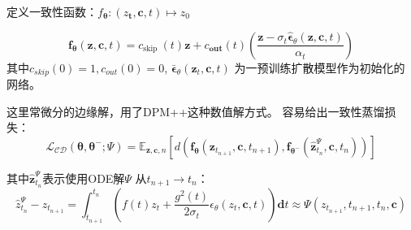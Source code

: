 定义一致性函数：$f_{\boldsymbol{\theta}}:\left(z_{\boldsymbol{t}}, \boldsymbol{c}, t\right) \mapsto z_0$

\begin{equation}
\boldsymbol{f}_{\boldsymbol{\theta}}(\boldsymbol{z}, \boldsymbol{c}, t)=c_{\text {skip }}(t) \boldsymbol{z}+c_{\mathbf{out}}(t)\left(\frac{\boldsymbol{z}-\sigma_t \hat{\boldsymbol{\epsilon}}_\theta(\boldsymbol{z}, \boldsymbol{c}, t)}{\alpha_t}\right)
\end{equation}
其中$c_{skip}(0)=1, c_{out}(0)=0$, $\boldsymbol{\bar{\epsilon}}_\theta\left(\boldsymbol{z}_t, \boldsymbol{c}, t\right)$ 为一预训练扩散模型作为初始化的网络。

这里常微分的边缘解，用了DPM++这种数值解方式。
容易给出一致性蒸馏损失：
\begin{equation}
\mathcal{L}_{\mathcal{C D}}\left(\boldsymbol{\theta}, \boldsymbol{\theta}^{-} ; \Psi\right)=\mathbb{E}_{\boldsymbol{z}, \boldsymbol{c}, n}\left[d\left(\boldsymbol{f}_{\boldsymbol{\theta}}\left(\boldsymbol{z}_{t_{n+1}}, \boldsymbol{c}, t_{n+1}\right), \boldsymbol{f}_{\boldsymbol{\theta}^{-}}\left(\hat{\boldsymbol{z}}_{t_n}^{\Psi}, \boldsymbol{c}, t_n\right)\right)\right]
\end{equation}

其中$\hat{\boldsymbol{z}}_{t_n}^{\Psi}$表示使用ODE解$\Psi$ 从$t_{n+1} \rightarrow t_n$：
\begin{equation}
\hat{z}_{t_n}^{\Psi}-z_{t_{n+1}}=\int_{t_{n+1}}^{t_n}\left(f(t) z_t+\frac{g^2(t)}{2 \sigma_t} \epsilon_\theta\left(z_t, \boldsymbol{c}, t\right)\right) \mathbf{d} t \approx \Psi\left(z_{t_{n+1}}, t_{n+1}, t_n, \boldsymbol{c}\right)
\end{equation}

